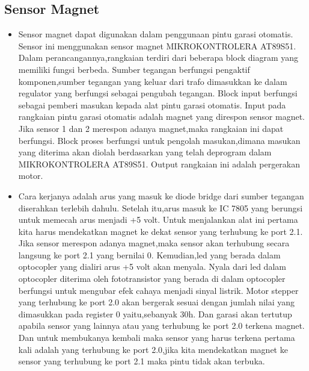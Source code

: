 \subsection{Sensor Magnet}
	\begin	{itemize}
	\item Sensor magnet dapat digunakan dalam penggunaan pintu garasi otomatis. Sensor ini menggunakan sensor magnet MIKROKONTROLERA AT89S51. Dalam perancangannya,rangkaian terdiri dari beberapa block diagram yang memiliki fungsi berbeda. Sumber tegangan berfungsi pengaktif komponen,sumber tegangan yang keluar dari trafo dimasukkan ke dalam regulator yang berfungsi sebagai pengubah tegangan. Block input berfungsi sebagai pemberi masukan kepada alat pintu garasi otomatis. Input pada rangkaian pintu garasi otomatis adalah magnet yang direspon sensor magnet. Jika sensor 1 dan 2 merespon adanya magnet,maka rangkaian ini dapat berfungsi. Block proses berfungsi untuk pengolah masukan,dimana masukan yang diterima akan diolah berdasarkan yang telah deprogram dalam MIKROKONTROLERA AT89S51. Output rangkaian ini adalah pergerakan motor. 
	\item Cara kerjanya adalah arus yang masuk ke diode bridge dari sumber tegangan diserahkan terlebih dahulu. Setelah itu,arus masuk  ke IC 7805 yang berungsi untuk memecah arus menjadi +5 volt. Untuk menjalankan alat ini pertama kita harus mendekatkan magnet ke dekat sensor yang terhubung ke port 2.1. Jika sensor merespon adanya magnet,maka sensor akan terhubung secara langsung ke port 2.1 yang bernilai 0. Kemudian,led yang berada dalam optocopler yang dialiri arus +5 volt akan menyala. Nyala dari led dalam optocopler diterima oleh fototransistor yang berada di dalam optocopler berfungsi untuk mengubar efek cahaya menjadi sinyal listrik.
		  Motor stepper yang terhubung ke port 2.0 akan bergerak sesuai dengan jumlah nilai yang dimasukkan pada register 0 yaitu,sebanyak 30h. Dan garasi akan tertutup apabila sensor yang lainnya atau yang terhubung ke port 2.0 terkena magnet. Dan untuk membukanya kembali maka sensor yang harus terkena pertama kali adalah yang terhubung ke port 2.0,jika kita mendekatkan magnet ke sensor yang terhubung  ke port 2.1 maka pintu tidak akan terbuka.
	\end{itemize}
